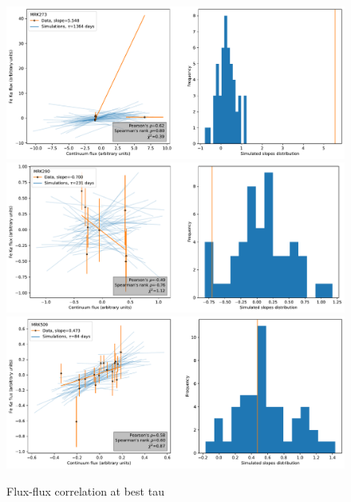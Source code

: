\begin{figure}
\begin{center}
    {
  \includegraphics[width=\textwidth]{Figs/Chapter5/Flux_corr/Flux_flux_MRK273_besttau.pdf} \\
  \includegraphics[width=\textwidth]{Figs/Chapter5/Flux_corr/Flux_flux_MRK290_besttau.pdf} \\
  \includegraphics[width=\textwidth]{Figs/Chapter5/Flux_corr/Flux_flux_MRK509_besttau.pdf}  \\
  \caption{Flux-flux correlation at best tau}
    \label{fig:Flux-flux_all_2}
  }
\end{center}
\end{figure}

